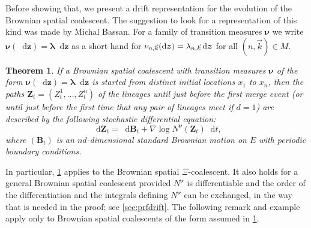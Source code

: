 \documentclass[reqno,draft]{amsart}
\numberwithin{equation}{section}
\theoremstyle{plain}
\newtheorem{theorem}{Theorem}[section]
\theoremstyle{remark}
\newcommand*\diff{\mathop{}\!\mathrm{d}}
\newcommand{\mergers}{M}
\newcommand{\nunk}{\nu_{n,\smash{\vec{k}}}}
\newcommand{\lank}{\lambda_{n,\smash{\vec{k}}}}
\begin{document}
Before showing that, we present a drift representation for the evolution of the Brownian spatial coalescent. The suggestion to look for a representation of this kind was made by Michal Bassan.
For a family of transition measures $\boldsymbol \nu$ we write $\boldsymbol \nu(\diff \boldsymbol z) = \boldsymbol \lambda \diff \boldsymbol z$ as a short hand for $\nunk(\diff \boldsymbol z) = \lank \diff \boldsymbol z$ for all $(n,\vec{k}) \in \mergers$.

\begin{theorem}\label{thm:driftintro}
    If a Brownian spatial coalescent with transition measures $\boldsymbol \nu$ of the form $\boldsymbol \nu(\diff \boldsymbol z) = \boldsymbol \lambda \diff \boldsymbol z$ is started from distinct initial locations $x_1$ to $x_n$, then the paths $\boldsymbol Z_t = (Z^1_t, \ldots ,Z^n_t)$ of the lineages until just before the first merge event (or until just before the first time that any pair of lineages meet if $d = 1$) are described by the following stochastic differential equation:
    \begin{equation}\label{eq:driftintro}
        \diff \boldsymbol Z_t = \diff \boldsymbol B_t + \nabla \log N^{\boldsymbol \nu}(\boldsymbol Z_t) \diff t,
    \end{equation}
    where $(\boldsymbol B_t)$ is an $nd$-dimensional standard Brownian motion on $E$ with periodic boundary conditions.
\end{theorem}

In particular, \cref{thm:driftintro} applies to the Brownian spatial $\Xi$-coalescent. It also holds for a general Brownian spatial coalescent provided $N^{\boldsymbol \nu}$ is differentiable and the order of the differentiation and the integrals defining $N^{\boldsymbol \nu}$ can be exchanged, in the way that is needed in the proof; see \cref{sec:prfdrift}. The following remark and example apply only to Brownian spatial coalescents of the form assumed in \cref{thm:driftintro}.
\end{document}
